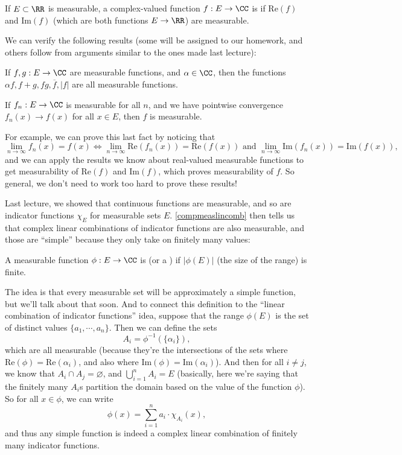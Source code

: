 \begin{definition}
If $E \subset \RR$ is measurable, a complex-valued function $f: E \to \CC$ is  if $\text{Re}(f)$ and $\text{Im}(f)$ (which are both functions $E \to \RR$) are measurable.
\end{definition}

We can verify the following results (some will be assigned to our homework, and others follow from arguments similar to the ones made last lecture):

\begin{theorem}\label{compmeaslincomb}
If $f, g: E \to \CC$ are measurable functions, and $\alpha \in \CC$, then the functions $\alpha f, f + g, fg, \overline{f}, |f|$ are all measurable functions.
\end{theorem}

\begin{theorem}
If $f_n: E \to \CC$ is measurable for all $n$, and we have pointwise convergence $f_n(x) \to f(x)$ for all $x \in E$, then $f$ is measurable.
\end{theorem}

For example, we can prove this last fact by noticing that 
\[
    \lim_{n \to \infty} f_n(x) = f(x) \iff \lim_{n \to \infty} \text{Re}(f_n(x)) = \text{Re}(f(x)) \text{ and } \lim_{n \to \infty} \text{Im}(f_n(x)) = \text{Im}(f(x)),
\]  
and we can apply the results we know about real-valued measurable functions to get measurability of $\text{Re}(f)$ and $\text{Im}(f)$, which proves measurability of $f$. So general, we don't need to work too hard to prove these results!

Last lecture, we showed that continuous functions are measurable, and so are indicator functions $\chi_E$ for measurable sets $E$. \cref{compmeaslincomb} then tells us that complex linear combinations of indicator functions are also measurable, and those are ``simple'' because they only take on finitely many values:

\begin{definition}
A measurable function $\phi: E \to \CC$ is  (or a ) if $|\phi(E)|$ (the size of the range) is finite.
\end{definition}

The idea is that every measurable set will be approximately a simple function, but we'll talk about that soon. And to connect this definition to the ``linear combination of indicator functions'' idea, suppose that the range $\phi(E)$ is the set of distinct values $\{a_1, \cdots, a_n\}$. Then we can define the sets 
\[
    A_i = \phi^{-1}\left(\{\alpha_i\}\right), 
\]
which are all measurable (because they're the intersections of the sets where $\text{Re}(\phi) = \text{Re}(\alpha_i)$, and also where $\text{Im}(\phi) = \text{Im}(\alpha_i)$). And then for all $i \ne j$, we know that $A_i \cap A_j = \varnothing$, and $\bigcup_{i=1}^n A_i = E$ (basically, here we're saying that the finitely many $A_i$s partition the domain based on the value of the function $\phi$). So for all $x \in \phi$, we can write
\[
    \phi(x) = \sum_{i=1}^n a_i \cdot \chi_{A_i}(x),
\]
and thus any simple function is indeed a complex linear combination of finitely many indicator functions.

